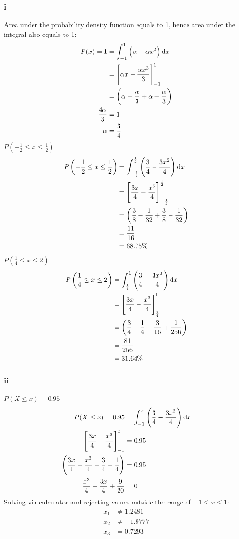 \documentclass[11pt]{article}
\numberwithin{equation}{section}
\begin{document}
\subsubsection{i}
Area under the probability density function equals to 1, hence area under the integral also equals to 1: 
\begin{align}
    F(x) = 1 &= \int_{-1}^1 \left(\alpha - \alpha x^2\right) \dif x\\
    &= \left[\alpha x - \frac{\alpha x^3}{3}\right]_{-1}^{1}\\
    &= \left(\alpha - \frac{\alpha}{3} + \alpha -\frac{\alpha}{3} \right)\\
    \frac{4\alpha}{3} &= 1\\
    \alpha &= \frac{3}{4}
\end{align}
$P\left(-\frac{1}{2} \leq x \leq \frac{1}{2} \right)$
\begin{align}
    P\left(-\frac{1}{2} \leq x \leq \frac{1}{2} \right) &= \int_{-\frac{1}{2}}^{\frac{1}{2}} \left(\frac{3}{4} - \frac{3x^2}{4}\right) \dif x\\
    &= \left[\frac{3x}{4} - \frac{x^3}{4}\right]_{-\frac{1}{2}}^{\frac{1}{2}}\\
    &= \left(\frac{3}{8} - \frac{1}{32} + \frac{3}{8} - \frac{1}{32} \right)\\
    &= \frac{11}{16}\\
    &= 68.75\%
\end{align}
$P\left(\frac{1}{4} \leq x \leq 2 \right)$
\begin{align}
    P\left(\frac{1}{4} \leq x \leq 2 \right) &= \int_{\frac{1}{4}}^{1} \left(\frac{3}{4} - \frac{3x^2}{4}\right) \dif x\\
    &= \left[\frac{3x}{4} - \frac{x^3}{4}\right]_{\frac{1}{4}}^{1}\\
    &= \left(\frac{3}{4} - \frac{1}{4} - \frac{3}{16} + \frac{1}{256} \right)\\
    &= \frac{81}{256}\\
    &= 31.64\%
\end{align}
\subsubsection{ii}
$P(X \leq x) = 0.95$
\begin{align}
    P(X \leq x) = 0.95 &= \int_{-1}^{x} \left(\frac{3}{4} - \frac{3x^2}{4}\right) \dif x\\
    \left[\frac{3x}{4} - \frac{x^3}{4}\right]_{-1}^{x} &= 0.95 \\
    \left(\frac{3x}{4} - \frac{x^3}{4} + \frac{3}{4} - \frac{1}{4} \right) &= 0.95\\
    \frac{x^3}{4} -\frac{3x}{4} + \frac{9}{20} &= 0
\end{align}
Solving via calculator and rejecting values outside the range of $-1 \leq x \leq 1$:
\begin{align}
    x_1 &\neq 1.2481\\
    x_2 &\neq -1.9777\\
    x_3 &= 0.7293
\end{align}
\end{document}

